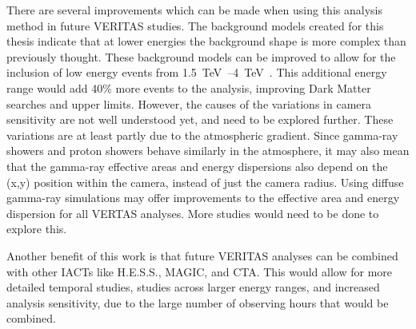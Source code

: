There are several improvements which can be made when using this analysis method in future VERITAS studies.
The background models created for this thesis indicate that at lower energies the background shape is more complex than previously thought.
These background models can be improved to allow for the inclusion of low energy events from \SIrange{1.5}{4}{\TeV{}}.
This additional energy range would add \nicetilde{}40\% more events to the analysis, improving Dark Matter searches and upper limits.
However, the causes of the variations in camera sensitivity are not well understood yet, and need to be explored further.
These variations are at least partly due to the atmospheric gradient.
Since gamma-ray showers and proton showers behave similarly in the atmosphere, it may also mean that the gamma-ray effective areas and energy dispersions also depend on the (x,y) position within the camera, instead of just the camera radius.
Using diffuse gamma-ray simulations may offer improvements to the effective area and energy dispersion for all VERTAS analyses.
More studies would need to be done to explore this.

Another benefit of this work is that future VERITAS analyses can be combined with other IACTs like H.E.S.S., MAGIC, and CTA.
This would allow for more detailed temporal studies, studies across larger energy ranges, and increased analysis sensitivity, due to the large number of observing hours that would be combined.


